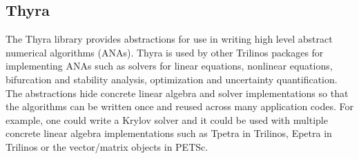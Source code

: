 \subsection{Thyra}
The Thyra library provides abstractions for use in writing high level abstract numerical algorithms (ANAs). Thyra is used by other Trilinos packages for implementing ANAs such as solvers for linear equations, nonlinear equations, bifurcation and stability analysis, optimization and uncertainty quantification. The abstractions hide concrete linear algebra and solver implementations so that the algorithms can be written once and reused across many application codes. For example, one could write a Krylov solver and it could be used with multiple concrete linear algebra implementations such as Tpetra in Trilinos, Epetra in Trilinos or the vector/matrix objects in PETSc.

